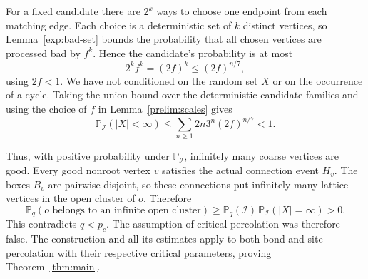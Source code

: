 For a fixed candidate there are $2^k$ ways to choose one endpoint from
each matching edge. Each choice is a deterministic set of $k$ distinct
vertices, so Lemma~\ref{exp:bad-set} bounds the probability that all
chosen vertices are processed bad by $f^k$. Hence the candidate's
probability is at most
\[
 2^k f^k=(2f)^k\le(2f)^{n/7},
\]
using $2f<1$. We have not conditioned on the random set $X$ or on the
occurrence of a cycle. Taking the union bound over the deterministic
candidate families and using the choice of $f$ in
Lemma~\ref{prelim:scales} gives
\begin{equation}
 \mathbb P_{\mathcal I}(|X|<\infty)
 \le\sum_{n\ge1}2n3^n(2f)^{n/7}<1.
 \label{exp:infinite-good}
\end{equation}

Thus, with positive probability under $\mathbb P_{\mathcal I}$,
infinitely many coarse vertices are good. Every good nonroot vertex
$v$ satisfies the actual connection event $H_v$. The boxes $B_v$ are
pairwise disjoint, so these connections put infinitely many lattice
vertices in the open cluster of $o$. Therefore
\[
 \mathbb P_q(o\text{ belongs to an infinite open cluster})
 \ge \mathbb P_q(\mathcal I)\,
       \mathbb P_{\mathcal I}(|X|=\infty)>0.
\]
This contradicts $q<p_c$. The assumption of critical percolation was
therefore false. The construction and all its estimates apply to
both bond and site percolation with their respective critical
parameters, proving Theorem~\ref{thm:main}.

